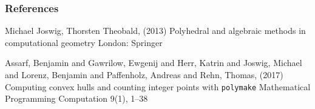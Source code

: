 \documentclass[9pt]{beamer}
\theoremstyle{definition}
\begin{document}

\begin{frame}
  \frametitle{References}
  \footnotesize{
    \begin{thebibliography}{99} %
     Michael Joswig, Thorsten Theobald, (2013)
      \newblock Polyhedral and algebraic methods in computational geometry
      \newblock London: Springer

     Assarf, Benjamin and Gawrilow, Ewgenij and Herr, Katrin and Joswig, Michael and Lorenz, Benjamin and Paffenholz, Andreas and Rehn, Thomas, (2017)
      \newblock Computing convex hulls and counting integer points with \texttt{polymake}
      \newblock Mathematical Programming Computation 9(1), 1--38 



    \end{thebibliography}
  }
\end{frame}

\end{document}
